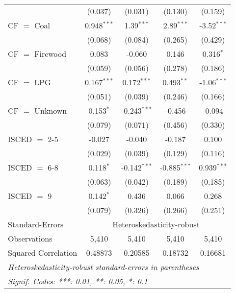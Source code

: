 \begin{table}[htbp!]
\begin{adjustbox}{width = 1\textwidth, max height = 0.95\textheight, center}
\begin{threeparttable}[b]
\begin{tabular}{lcccc}
                                 & (0.037)            & (0.031)            & (0.130)        & (0.159)\\   
            CF $=$ Coal          & 0.948$^{***}$      & 1.39$^{***}$       & 2.89$^{***}$   & -3.52$^{***}$\\   
                                 & (0.068)            & (0.084)            & (0.265)        & (0.429)\\   
            CF $=$ Firewood      & 0.083              & -0.060             & 0.146          & 0.316$^{*}$\\   
                                 & (0.059)            & (0.056)            & (0.278)        & (0.186)\\   
            CF $=$ LPG           & 0.167$^{***}$      & 0.172$^{***}$      & 0.493$^{**}$   & -1.06$^{***}$\\   
                                 & (0.051)            & (0.039)            & (0.246)        & (0.166)\\   
            CF $=$ Unknown       & 0.153$^{*}$        & -0.243$^{***}$     & -0.456         & -0.094\\   
                                 & (0.079)            & (0.071)            & (0.456)        & (0.330)\\   
            ISCED $=$ 2-5        & -0.027             & -0.040             & -0.187         & 0.100\\   
                                 & (0.029)            & (0.039)            & (0.129)        & (0.116)\\   
            ISCED $=$ 6-8        & 0.118$^{*}$        & -0.142$^{***}$     & -0.885$^{***}$ & 0.939$^{***}$\\   
                                 & (0.063)            & (0.042)            & (0.189)        & (0.185)\\   
            ISCED $=$ 9          & 0.142$^{*}$        & 0.436              & 0.066          & 0.268\\   
                                 & (0.079)            & (0.326)            & (0.266)        & (0.251)\\   
            \midrule 
            Standard-Errors & \multicolumn{4}{c}{Heteroskedasticity-robust} \\ 
            Observations         & 5,410              & 5,410              & 5,410          & 5,410\\  
            Squared Correlation  & 0.48873            & 0.20585            & 0.18732        & 0.16681\\  
            \midrule \midrule
            \multicolumn{5}{l}{\emph{Heteroskedasticity-robust standard-errors in parentheses}}\\
            \multicolumn{5}{l}{\emph{Signif. Codes: ***: 0.01, **: 0.05, *: 0.1}}\\
         \end{tabular}
         

\end{threeparttable}
\end{adjustbox}
\end{table}
